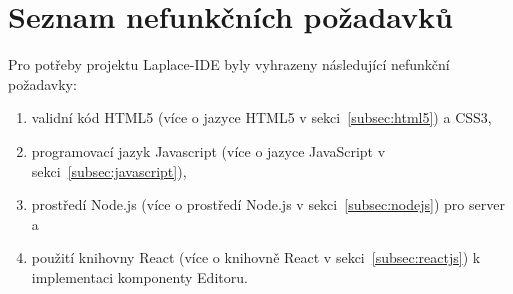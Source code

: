 
\section{Seznam nefunkčních požadavků}\label{sec:nefuncniPozadavky}

Pro potřeby projektu Laplace-IDE byly vyhrazeny následující nefunkční požadavky:
\begin{enumerate}
    \item validní kód HTML5 (více o jazyce HTML5 v sekci~\ref{subsec:html5}) a \gls{CSS3},
    \item programovací jazyk Javascript (více o jazyce JavaScript v sekci~\ref{subsec:javascript}),
    \item prostředí Node.js (více o prostředí Node.js v sekci~\ref{subsec:nodejs}) pro server a
    \item použití knihovny React (více o knihovně React v sekci~\ref{subsec:reactjs}) k implementaci komponenty Editoru.
\end{enumerate}
